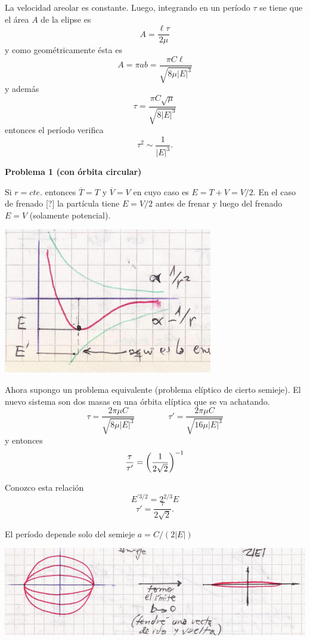 \documentclass[10pt,oneside]{CBFT_book}
\begin{document}
La velocidad areolar es constante. Luego, integrando en un período $\tau$ se tiene que el área $A$ de la elipse es
\[
	A = \frac{\ell \tau}{2\mu}
\]
y como geométricamente ésta es 
\[
	A = \pi a b = \frac{ \pi C \ell }{\sqrt{ 8 \mu |E|^3 }}
\]
y además 
\[
	\tau = \frac{ \pi C \sqrt{\mu } }{ \sqrt{ 8 |E|^3 } }
\]
entonces el período verifica 
\[
	\tau^2 \sim \frac 1 {|E|^{3}}.
\]

\begin{ejemplo}{\bf Problema 1 (con órbita circular)}

Si $r=cte.$ entonces $\overline{T}=T$ y $\overline{V}=V$ en cuyo caso es $E = T + V = V/2$. En el caso de frenado [?] la partícula
tiene $E=V/2$ antes de frenar y luego del frenado $E=V$ (solamente potencial).

\includegraphics[scale=0.3]{images/fig_mc_potencial_energy.jpg}

Ahora supongo un problema equivalente (problema elíptico de cierto semieje). El nuevo sistema son dos masas en una
órbita elíptica que se va achatando.
\[
	\tau = \frac{ 2 \pi \mu C }{\sqrt{ 8 \mu |E|^3 }} \qquad \qquad 
	\tau' = \frac{ 2 \pi \mu C }{\sqrt{ 16 \mu |E|^3 }}
\]
y entonces
\[
	\frac{\tau}{\tau'} = \left( \frac{ 1 }{ 2\sqrt{2} } \right)^{-1}
\]

Conozco esta relación 
\[
	E^{'3/2} = 2^{2/3} E
\]
\[
	\tau' = \frac{\tau}{2\sqrt{2}}.
\]

El período depende solo del semieje $a = C/(2|E|)$

\includegraphics[scale=0.3]{images/fig_mc_potencial_energy_elipses.jpg}


\end{ejemplo}
\end{document}

